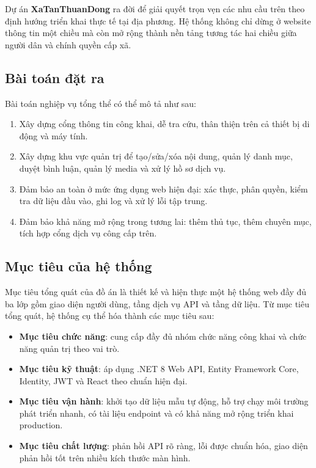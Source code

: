 \documentclass[12pt,a4paper]{article}
\begin{document}
Dự án \textbf{XaTanThuanDong} ra đời để giải quyết trọn vẹn các nhu cầu trên theo định hướng triển khai thực tế tại địa phương. Hệ thống không chỉ dừng ở website thông tin một chiều mà còn mở rộng thành nền tảng tương tác hai chiều giữa người dân và chính quyền cấp xã.

\subsection{Bài toán đặt ra}
Bài toán nghiệp vụ tổng thể có thể mô tả như sau:
\begin{enumerate}[leftmargin=1.1cm]
  \item Xây dựng cổng thông tin công khai, dễ tra cứu, thân thiện trên cả thiết bị di động và máy tính.
  \item Xây dựng khu vực quản trị để tạo/sửa/xóa nội dung, quản lý danh mục, duyệt bình luận, quản lý media và xử lý hồ sơ dịch vụ.
  \item Đảm bảo an toàn ở mức ứng dụng web hiện đại: xác thực, phân quyền, kiểm tra dữ liệu đầu vào, ghi log và xử lý lỗi tập trung.
  \item Đảm bảo khả năng mở rộng trong tương lai: thêm thủ tục, thêm chuyên mục, tích hợp cổng dịch vụ công cấp trên.
\end{enumerate}

\subsection{Mục tiêu của hệ thống}
Mục tiêu tổng quát của đồ án là thiết kế và hiện thực một hệ thống web đầy đủ ba lớp gồm giao diện người dùng, tầng dịch vụ API và tầng dữ liệu. Từ mục tiêu tổng quát, hệ thống cụ thể hóa thành các mục tiêu sau:
\begin{itemize}[leftmargin=1.1cm]
  \item \textbf{Mục tiêu chức năng}: cung cấp đầy đủ nhóm chức năng công khai và chức năng quản trị theo vai trò.
  \item \textbf{Mục tiêu kỹ thuật}: áp dụng .NET 8 Web API, Entity Framework Core, Identity, JWT và React theo chuẩn hiện đại.
  \item \textbf{Mục tiêu vận hành}: khởi tạo dữ liệu mẫu tự động, hỗ trợ chạy môi trường phát triển nhanh, có tài liệu endpoint và có khả năng mở rộng triển khai production.
  \item \textbf{Mục tiêu chất lượng}: phản hồi API rõ ràng, lỗi được chuẩn hóa, giao diện phản hồi tốt trên nhiều kích thước màn hình.
\end{itemize}
\end{document}
